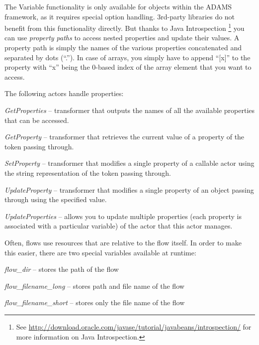 The Variable functionality is only available for objects within the ADAMS
framework, as it requires special option handling. 3rd-party libraries do not
benefit from this functionality directly. But thanks to Java Introspection
\footnote{See
\url{http://download.oracle.com/javase/tutorial/javabeans/introspection/}{} for
more information on Java Introspection.} you can use \textit{property paths} to
access nested properties and update their values. A property path is simply the
names of the various properties concatenated and separated by dots (``.''). In
case of arrays, you simply have to append ``[x]'' to the property with ``x''
being the 0-based index of the array element that you want to access.

The following actors handle properties:
\begin{tight_itemize}
	\item \textit{GetProperties} -- transformer that outputs the names
	of all the available properties that can be accessed.
	\item \textit{GetProperty} -- transformer that retrieves the current
	value of a property of the token passing through.
	\item \textit{SetProperty} -- transformer that modifies a single property of a
	callable actor using the string representation of the token passing through.
	\item \textit{UpdateProperty} -- transformer that modifies a single property
	of an object passing through using the specified value.
	\item \textit{UpdateProperties} -- allows you to update multiple properties
	(each property is associated with a particular variable) of the actor that
	this actor manages.
\end{tight_itemize}

Often, flows use resources that are relative to the flow itself. In order to
make this easier, there are two special variables available at runtime:
\begin{tight_itemize}
	\item \textit{flow\_dir} -- stores the path of the flow
	\item \textit{flow\_filename\_long} -- stores path and file name of the flow
	\item \textit{flow\_filename\_short} -- stores only the file name of the flow
\end{tight_itemize}

\newpage
